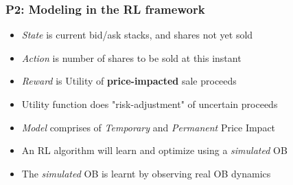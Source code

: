 \documentclass[handout]{beamer}
\begin{document}
\begin{frame}
\frametitle{P2: Modeling in the RL framework}
\pause
\begin{itemize}[<+->]
\item {\em State} is current bid/ask stacks, and shares not yet sold
\item {\em Action} is number of shares to be sold at this instant
\item {\em Reward} is Utility of {\bf price-impacted} sale proceeds
\item Utility function does "risk-adjustment" of uncertain proceeds
\item {\em Model} comprises of {\em Temporary} and {\em Permanent} Price Impact
\item An RL algorithm will learn and optimize using a {\em simulated} OB
\item The {\em simulated} OB is learnt by observing real OB dynamics
\end{itemize}
\end{frame}
\end{document}
